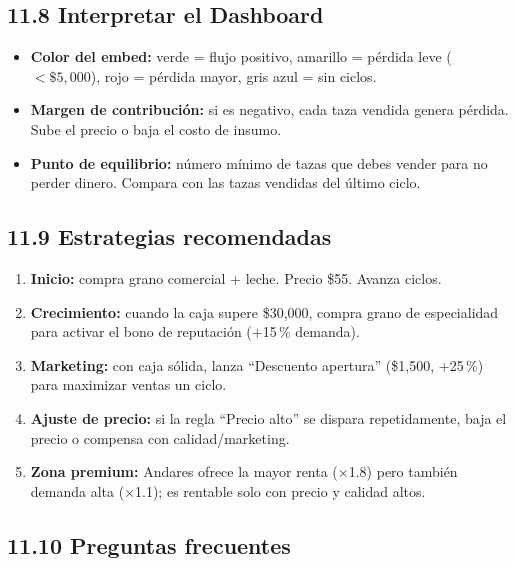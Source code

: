\documentclass[12pt,spanish]{article}
\begin{document}
\subsection*{11.8 Interpretar el Dashboard}

\begin{itemize}
  \item \textbf{Color del embed:} verde = flujo positivo, amarillo = pérdida leve
        ($< \$5{,}000$), rojo = pérdida mayor, gris azul = sin ciclos.
  \item \textbf{Margen de contribución:} si es negativo, cada taza vendida genera
        pérdida. Sube el precio o baja el costo de insumo.
  \item \textbf{Punto de equilibrio:} número mínimo de tazas que debes vender para
        no perder dinero. Compara con las tazas vendidas del último ciclo.
\end{itemize}

\subsection*{11.9 Estrategias recomendadas}

\begin{enumerate}
  \item \textbf{Inicio:} compra grano comercial + leche. Precio \$55. Avanza ciclos.
  \item \textbf{Crecimiento:} cuando la caja supere \$30,000, compra grano de
        especialidad para activar el bono de reputación (+15\,\% demanda).
  \item \textbf{Marketing:} con caja sólida, lanza ``Descuento apertura'' (\$1,500,
        +25\,\%) para maximizar ventas un ciclo.
  \item \textbf{Ajuste de precio:} si la regla ``Precio alto'' se dispara
        repetidamente, baja el precio o compensa con calidad/marketing.
  \item \textbf{Zona premium:} Andares ofrece la mayor renta (×1.8) pero también
        demanda alta (×1.1); es rentable solo con precio y calidad altos.
\end{enumerate}

\subsection*{11.10 Preguntas frecuentes}
\end{document}

